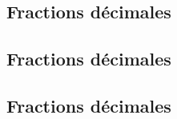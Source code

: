 \documentclass[12pt,a4paper]{article}
\begin{document}


\begin{myexs}
	\begin{itemize}
		\iftoggle{eleve}{%
			\item \vspace*{0.2cm}
			\hrulefill
			
			\item \vspace*{0.2cm}
			\hrulefill
		}{%
			\item $\dfrac{1}{2} = \dfrac{1 \times 2}{2 \times 2} = \dfrac{2}{4}$ 
			\item $\dfrac{2}{6} = \dfrac{2 \div 2}{6 \div 2} = \dfrac{1}{3}$ , ici on  a simplifié par 2, la fraction $\dfrac{2}{6}$.
		}
	\end{itemize}
\end{myexs}

\subsection{Fractions décimales}




\setcounter{subsection}{1}

\subsection{Fractions décimales}



\setcounter{subsection}{1}

\subsection{Fractions décimales}


%
%
%
%
%
%



%
\end{document}

